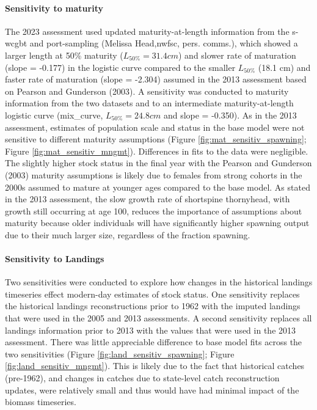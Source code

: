 \documentclass[11pt,
  english,
  letterpaper,
]{article}
\begin{document}
\hypertarget{sensitivity-to-maturity}{%
\paragraph{Sensitivity to maturity}\label{sensitivity-to-maturity}}

The 2023 assessment used updated maturity-at-length information from the \gls{s-wcgbt} and port-sampling (Melissa Head,\gls{nwfsc}, pers. comms.), which showed a larger length at 50\% maturity (\(L_{50\%} = 31.4 cm\)) and slower rate of maturation (slope = -0.177) in the logistic curve compared to the smaller \(L_{50\%}\) (18.1 cm) and faster rate of maturation (slope = -2.304) assumed in the 2013 assessment based on Pearson and Gunderson (2003). A sensitivity was conducted to maturity information from the two datasets and to an intermediate maturity-at-length logistic curve (mix\_curve, \(L_{50\%} = 24.8 cm\) and slope = -0.350). As in the 2013 assessment, estimates of population scale and status in the base model were not sensitive to different maturity assumptions (Figure \ref{fig:mat_sensitiv_spawning}; Figure \ref{fig:mat_sensitiv_mngmt}). Differences in fits to the data were negligible. The slightly higher stock status in the final year with the Pearson and Gunderson (2003) maturity assumptions is likely due to females from strong cohorts in the 2000s assumed to mature at younger ages compared to the base model. As stated in the 2013 assessment, the slow growth rate of shortspine thornyhead, with growth still occurring at age 100, reduces the importance of assumptions about maturity because older individuals will have significantly higher spawning output due to their much larger size, regardless of the fraction spawning.

\hypertarget{sensitivity-to-landings}{%
\paragraph{Sensitivity to Landings}\label{sensitivity-to-landings}}

Two sensitivities were conducted to explore how changes in the historical landings timeseries effect modern-day estimates of stock status. One sensitivity replaces the historical landings reconstructions prior to 1962 with the imputed landings that were used in the 2005 and 2013 assessments. A second sensitivity replaces all landings information prior to 2013 with the values that were used in the 2013 assessment. There was little appreciable difference to base model fits across the two sensitivities (Figure \ref{fig:land_sensitiv_spawning}; Figure \ref{fig:land_sensitiv_mngmt}). This is likely due to the fact that historical catches (pre-1962), and changes in catches due to state-level catch reconstruction updates, were relatively small and thus would have had minimal impact of the biomass timeseries.
\end{document}
